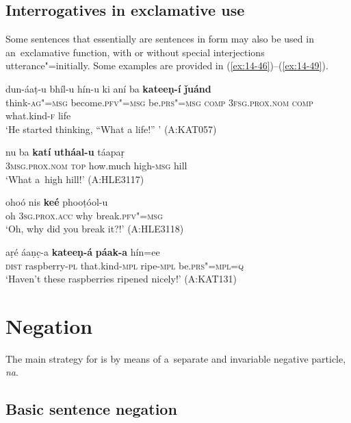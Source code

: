 \subsection{Interrogatives in exclamative use}
\label{subsec:14-2-4}

Some sentences that essentially are  sentences in form may also be used in an~exclamative function, with or without special interjections utterance"=initially. Some examples are provided in (\ref{ex:14-46})--(\ref{ex:14-49}). 

\ea
\label{ex:14-46}
\gll dun-áaṭ-u bhíl-u hín-u ki  aní ba \textbf{kateeṇ-í} \textbf{ǰuánd} \\
think-\textsc{ag"=msg} become.\textsc{pfv"=msg} be.\textsc{prs"=msg} \textsc{comp}  \textsc{3fsg.prox.nom} \textsc{comp} what.kind-\textsc{f} life  \\
\glt `He started thinking, ``What a life!'' ' (A:KAT057)

\ex
\label{ex:14-47}
\gll nu ba \textbf{katí} \textbf{utháal-u} táapaṛ \\
\textsc{3msg.prox.nom} \textsc{top} how.much high-\textsc{msg} hill  \\
\glt `What a~high hill!' (A:HLE3117)

\ex
\label{ex:14-48}
\gll ohoó nis \textbf{keé} phooṭóol-u \\
oh \textsc{3sg.prox.acc} why break.\textsc{pfv"=msg} \\
\glt `Oh, why did you break it?!' (A:HLE3118)

\ex
\label{ex:14-49}
\gll aṛé áaṇc̣-a \textbf{kateeṇ-á} \textbf{páak-a} hín=ee \\
\textsc{dist} raspberry-\textsc{pl} that.kind-\textsc{mpl} ripe-\textsc{mpl} be.\textsc{prs"=mpl=q} \\
\glt `Haven't these raspberries ripened nicely!' (A:KAT131)
\z

\section{Negation}
\label{sec:14-3}


The main strategy for  is by means of a~separate and invariable negative particle, \textit{na}. 


\subsection{Basic sentence negation}
\label{subsec:14-3-1}


